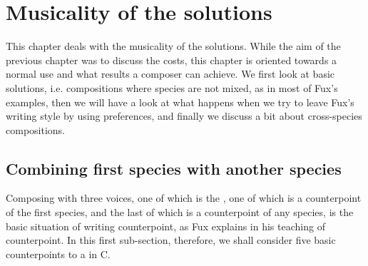 \chapter{Musicality of the solutions}\label{chapter:musicality}
This chapter deals with the musicality of the solutions. While the aim of the previous chapter was to discuss the costs, this chapter is oriented towards a normal use and what results a composer can achieve. We first look at basic solutions, i.e. compositions where species are not mixed, as in most of Fux's examples, then we will have a look at what happens when we try to leave Fux's writing style by using preferences, and finally we discuss a bit about cross-species compositions.

\section{Combining first species with another species}
Composing with three voices, one of which is the \cf, one of which is a counterpoint of the first species, and the last of which is a counterpoint of any species, is the basic situation of writing counterpoint, as Fux explains in his teaching of counterpoint. In this first sub-section, therefore, we shall consider five basic counterpoints to a \cfs in C.

